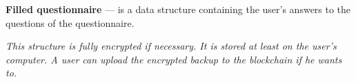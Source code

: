 %
%
%
%
%
%
%
\textbf{Filled questionnaire} --- is a data structure containing the user’s answers to the questions of the questionnaire.
%
%
%
%

\begin{note} \it
 This structure is fully encrypted if necessary. It is stored at least on the user’s computer. A user can upload the encrypted backup to the blockchain if he wants to.
\end{note}

%
%
%
%
%
%
%


